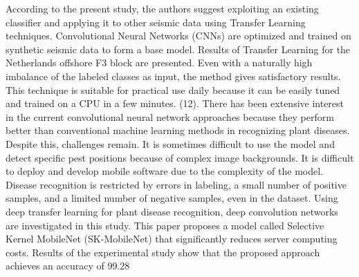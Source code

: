 \documentclass[conference]{IEEEtran}
\begin{document}
According to the present study, the authors suggest exploiting an existing classifier and applying it to other seismic data using Transfer Learning techniques. Convolutional Neural Networks (CNNs) are optimized and trained on synthetic seismic data to form a base model. Results of Transfer Learning for the Netherlands offshore F3 block are presented. Even with a naturally high imbalance of the labeled classes as input, the method gives satisfactory results. This technique is suitable for practical use daily because it can be easily tuned and trained on a CPU in a few minutes. (12). There has been extensive interest in the current convolutional neural network approaches because they perform better than conventional machine learning methods in recognizing plant diseases. Despite this, challenges remain. It is sometimes difficult to use the model and detect specific pest positions because of complex image backgrounds. It is difficult to deploy and develop mobile software due to the complexity of the model. Disease recognition is restricted by errors in labeling, a small number of positive samples, and a limited number of negative samples, even in the dataset. Using deep transfer learning for plant disease recognition, deep convolution networks are investigated in this study. This paper proposes a model called Selective Kernel MobileNet (SK-MobileNet) that significantly reduces server computing costs. Results of the experimental study show that the proposed approach achieves an accuracy of 99.28%
\end{document}
